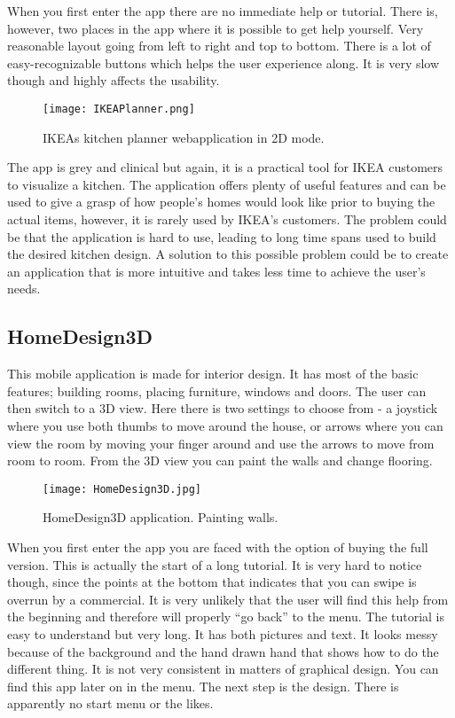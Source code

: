 When you first enter the app there are no immediate help or tutorial. There is, however, two places in the app where it is possible to get help yourself. Very reasonable layout going from left to right and top to bottom.  There is a lot of easy-recognizable buttons which helps the user experience along. 
It is very slow though and highly affects the usability. 

\begin{figure}[H]
\centering
\texttt{[image: IKEAPlanner.png]}
\caption{IKEAs kitchen planner webapplication in 2D mode.}
\end{figure}

The app is grey and clinical but again, it is a practical tool for IKEA customers to visualize a kitchen. 
The application offers plenty of useful features and can be used to give a grasp of how people’s homes would look like prior to buying the actual items, however, it is rarely used by IKEA’s customers. The problem could be that the application is hard to use, leading to long time spans used to build the desired kitchen design. A solution to this possible problem could be to create an application that is more intuitive and takes less time to achieve the user’s needs.

\subsection{HomeDesign3D}
This mobile application is made for interior design. It has most of the basic features; building rooms, placing furniture, windows and doors. The user can then switch to a 3D view. Here there is two settings to choose from - a joystick where you use both thumbs to move around the house, or arrows where you can view the room by moving your finger around and use the arrows to move from room to room. From the 3D view you can paint the walls and change flooring.

\begin{figure}[H]
\centering
\texttt{[image: HomeDesign3D.jpg]}
\caption{HomeDesign3D application. Painting walls.}
\end{figure}

When you first enter the app you are faced with the option of buying the full version. This is actually the start of a long tutorial. It is very hard to notice though, since the points at the bottom that indicates that you can swipe is overrun by a commercial. It is very unlikely that the user will find this help from the beginning and therefore will properly “go back” to the menu. The tutorial is easy to understand but very long. It has both pictures and text. It looks messy because of the background and the hand drawn hand that shows how to do the different thing. It is not very consistent in matters of graphical design. 
You can find this app later on in the menu. 
The next step is the design. There is apparently no start menu or the likes. 

